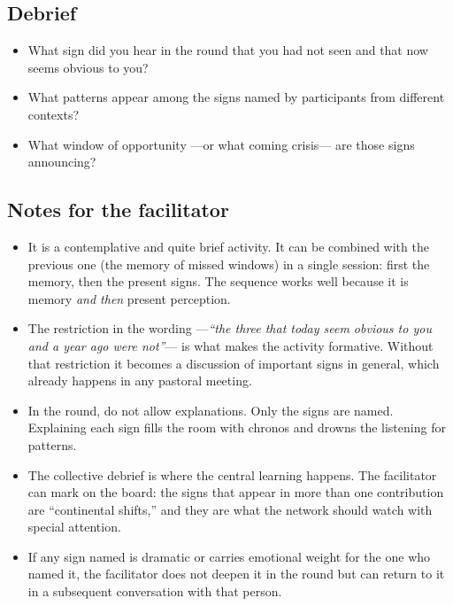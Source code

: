 \documentclass[11pt, a4paper]{article}
\begin{document}
\begin{actividad}
\subsection*{Debrief}
\begin{itemize}
  \item What sign did you hear in the round that you had not seen and that now seems obvious to you?
  \item What patterns appear among the signs named by participants from different contexts?
  \item What window of opportunity ---or what coming crisis--- are those signs announcing?
\end{itemize}

\subsection*{Notes for the facilitator}
\begin{itemize}
  \item It is a contemplative and quite brief activity. It can be combined with the previous one (the memory of missed windows) in a single session: first the memory, then the present signs. The sequence works well because it is memory \emph{and then} present perception.
  \item The restriction in the wording ---\emph{``the three that today seem obvious to you and a year ago were not''}--- is what makes the activity formative. Without that restriction it becomes a discussion of important signs in general, which already happens in any pastoral meeting.
  \item In the round, do not allow explanations. Only the signs are named. Explaining each sign fills the room with chronos and drowns the listening for patterns.
  \item The collective debrief is where the central learning happens. The facilitator can mark on the board: the signs that appear in more than one contribution are ``continental shifts,'' and they are what the network should watch with special attention.
  \item If any sign named is dramatic or carries emotional weight for the one who named it, the facilitator does not deepen it in the round but can return to it in a subsequent conversation with that person.
\end{itemize}

\end{actividad}

\newpage
\end{document}
